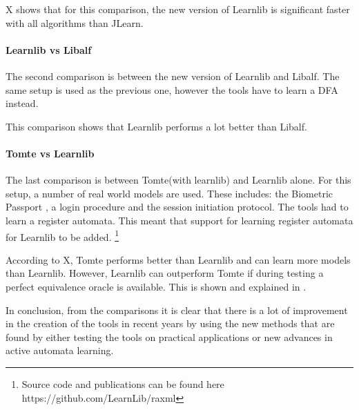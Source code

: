 \documentclass[multi,crop=false,class=article]{standalone}
\begin{document}
X shows that for this comparison, the new version of Learnlib is 
significant faster with all algorithms than JLearn.

\paragraph{Learnlib vs Libalf}
The second comparison is between the new version of Learnlib and Libalf.
The same setup is used as the previous one, however the tools have to learn a 
DFA instead.

This comparison shows that Learnlib performs a lot better than Libalf. 

\paragraph{Tomte vs Learnlib}
The last comparison is between Tomte(with learnlib) and Learnlib alone. 
For this setup, a number of real world models are used. These includes: the 
Biometric Passport \cite{Aarts2010}, a login procedure and the session 
initiation protocol. The tools had to learn a register automata. This meant 
that support for learning register automata for Learnlib to be added. 
\footnote{Source code and publications can be found here 
https://github.com/LearnLib/raxml}

According to X, Tomte performs better than Learnlib and can learn more models 
than Learnlib. However, Learnlib can outperform Tomte if during testing a 
perfect equivalence oracle is available. This is shown and explained in 
\cite{Aarts2014}.



In conclusion, from the comparisons it is clear that there is a lot of 
improvement in the creation of the tools in recent years by using the new 
methods that are found by either testing the tools on practical applications or 
new advances in active automata learning.
\end{document}
